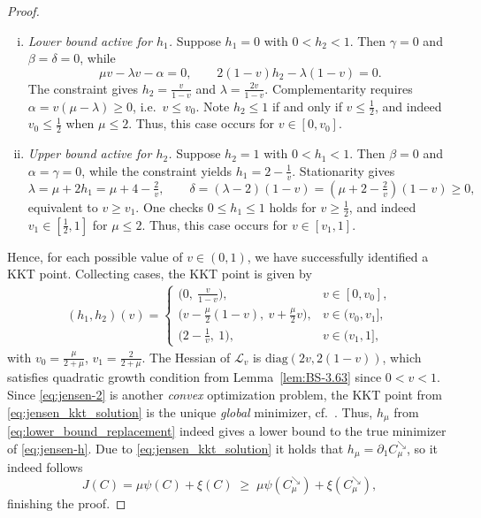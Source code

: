 \documentclass{article}
\newcommand{\1}{\mathds{1}}
\begin{document}
\begin{proof}
\begin{enumerate}[(i)]
\item \emph{Lower bound active for $h_1$.}  
Suppose $h_1=0$ with $0<h_2<1$.
Then $\gamma=0$ and $\beta=\delta=0$, while
\[
\mu v-\lambda v-\alpha=0, \qquad 2(1-v)h_2-\lambda(1-v)=0.
\]
The constraint gives $h_2=\tfrac{v}{1-v}$ and $\lambda=\tfrac{2v}{1-v}$.
Complementarity requires $\alpha=v(\mu-\lambda)\ge 0$, i.e.\ $v\le v_0$.
Note $h_2\le 1$ if and only if $v\le \tfrac12$, and indeed $v_0\le \tfrac12$ when $\mu\le 2$.
Thus, this case occurs for $v\in[0,v_0]$.

\item \emph{Upper bound active for $h_2$.}  
Suppose $h_2=1$ with $0<h_1<1$.
Then $\beta=0$ and $\alpha=\gamma=0$, while
the constraint yields $h_1=2-\tfrac1v$.
Stationarity gives
\[
\lambda=\mu+2h_1=\mu+4-\tfrac{2}{v}, 
\qquad
\delta=(\lambda-2)(1-v)=(\mu+2-\tfrac{2}{v})(1-v)\ge 0,
\]
equivalent to $v\ge v_1$.
One checks $0\le h_1\le 1$ holds for $v\ge \tfrac12$, 
and indeed $v_1\in[\tfrac12,1]$ for $\mu\le 2$.
Thus, this case occurs for $v\in[v_1,1]$.
\end{enumerate}

Hence, for each possible value of $v\in(0,1)$, we have successfully identified a KKT point.
Collecting cases, the KKT point is given by
\begin{align}\label{eq:jensen_kkt_solution}
(h_1,h_2)(v)=
\begin{cases}
\bigl(0,\ \tfrac{v}{1-v}\bigr), & v\in[0,v_0],\\[6pt]
\bigl(v-\tfrac{\mu}{2}(1-v),\ v+\tfrac{\mu}{2}v\bigr), & v\in(v_0,v_1],\\[6pt]
\bigl(2-\tfrac1v,\ 1\bigr), & v\in(v_1,1],
\end{cases}
\end{align}
with $v_0=\tfrac{\mu}{2+\mu}$, $v_1=\tfrac{2}{2+\mu}$.
The Hessian of $\mathcal{L}_v$ is $\mathrm{diag}(2v,2(1-v))$, which satisfies quadratic growth condition from Lemma~\ref{lem:BS-3.63} since $0<v<1$.
Since \eqref{eq:jensen-2} is another \emph{convex} optimization problem, the KKT point from \eqref{eq:jensen_kkt_solution} is the unique \emph{global} minimizer, cf.~\cite[Lem.~4.6]{ansari2025exact}.
Thus, $h_\mu$ from \eqref{eq:lower_bound_replacement} indeed gives a lower bound to the true minimizer of \eqref{eq:jensen-h}.
Due to \eqref{eq:jensen_kkt_solution} it holds that $h_\mu=\partial_1 C^{\searrow}_\mu$, so it indeed follows
\[
J(C)=\mu\psi(C)+\xi(C)\;\ge\;\mu\psi(C^{\searrow}_\mu)+\xi(C^{\searrow}_\mu),
\]
finishing the proof.
\end{proof}
\end{document}
